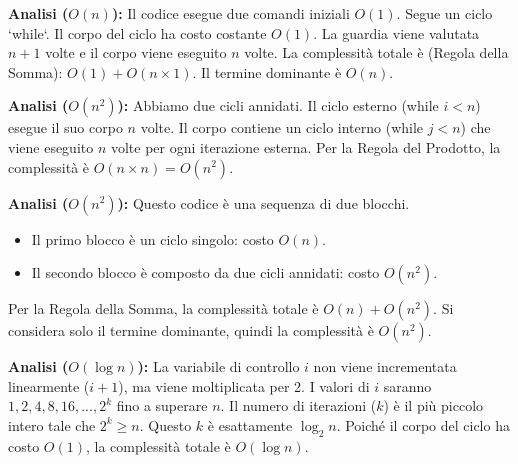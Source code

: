 \begin{example}
\textbf{Analisi ($O(n)$):} Il codice esegue due comandi iniziali $O(1)$. Segue un ciclo `while`. Il corpo del ciclo ha costo costante $O(1)$. La guardia viene valutata $n+1$ volte e il corpo viene eseguito $n$ volte.
La complessità totale è (Regola della Somma): $O(1) + O(n \times 1)$. Il termine dominante è $O(n)$.
\end{example}

\begin{example}
\textbf{Analisi ($O(n^2)$):} Abbiamo due cicli annidati. Il ciclo esterno (while $i<n$) esegue il suo corpo $n$ volte. Il corpo contiene un ciclo interno (while $j<n$) che viene eseguito $n$ volte per ogni iterazione esterna. Per la Regola del Prodotto, la complessità è $O(n \times n) = O(n^2)$.
\end{example}

\begin{example}
\textbf{Analisi ($O(n^2)$):} Questo codice è una sequenza di due blocchi.
\begin{itemize}
    \item Il primo blocco è un ciclo singolo: costo $O(n)$.
    \item Il secondo blocco è composto da due cicli annidati: costo $O(n^2)$.
\end{itemize}
Per la Regola della Somma, la complessità totale è $O(n) + O(n^2)$. Si considera solo il termine dominante, quindi la complessità è $O(n^2)$.
\end{example}

\begin{example}
\textbf{Analisi ($O(\log n)$):} La variabile di controllo $i$ non viene incrementata linearmente ($i+1$), ma viene moltiplicata per 2. I valori di $i$ saranno $1, 2, 4, 8, 16, ..., 2^k$ fino a superare $n$. Il numero di iterazioni ($k$) è il più piccolo intero tale che $2^k \ge n$. Questo $k$ è esattamente $\log_2 n$. Poiché il corpo del ciclo ha costo $O(1)$, la complessità totale è $O(\log n)$.
\end{example}

